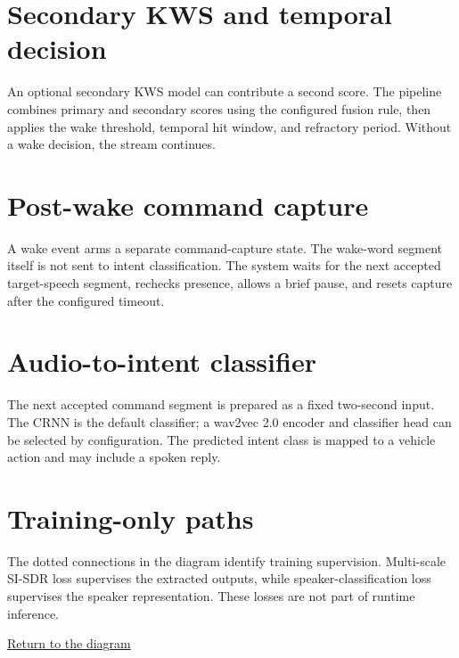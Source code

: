\documentclass{article}
\begin{document}
\hypertarget{secondary-kws}{\section*{Secondary KWS and temporal decision}}
An optional secondary KWS model can contribute a second score. The pipeline combines primary and secondary scores using the configured fusion rule, then applies the wake threshold, temporal hit window, and refractory period. Without a wake decision, the stream continues.

\hypertarget{command-capture}{\section*{Post-wake command capture}}
A wake event arms a separate command-capture state. The wake-word segment itself is not sent to intent classification. The system waits for the next accepted target-speech segment, rechecks presence, allows a brief pause, and resets capture after the configured timeout.

\hypertarget{intent-classifier}{\section*{Audio-to-intent classifier}}
The next accepted command segment is prepared as a fixed two-second input. The CRNN is the default classifier; a wav2vec 2.0 encoder and classifier head can be selected by configuration. The predicted intent class is mapped to a vehicle action and may include a spoken reply.

\hypertarget{training-losses}{\section*{Training-only paths}}
The dotted connections in the diagram identify training supervision. Multi-scale SI-SDR loss supervises the extracted outputs, while speaker-classification loss supervises the speaker representation. These losses are not part of runtime inference.

\vfill
\hyperlink{diagram-top}{Return to the diagram}
\end{document}
